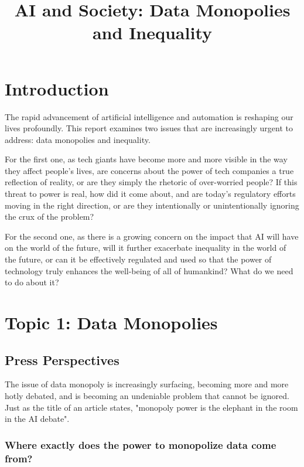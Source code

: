\documentclass[11pt]{article}
\title{AI and Society: Data Monopolies and Inequality}
\begin{document}
\maketitle

\section{Introduction}

The rapid advancement of artificial intelligence and automation is reshaping our lives profoundly. This report examines two issues that are increasingly urgent to address: data monopolies and inequality. 

For the first one, as tech giants have become more and more visible in the way they affect people's lives, are concerns about the power of tech companies a true reflection of reality, or are they simply the rhetoric of over-worried people? If this threat to power is real, how did it come about, and are today's regulatory efforts moving in the right direction, or are they intentionally or unintentionally ignoring the crux of the problem? 

For the second one, as there is a growing concern on the impact that AI will have on the world of the future, will it further exacerbate inequality in the world of the future, or can it be effectively regulated and used so that the power of technology truly enhances the well-being of all of humankind? What do we need to do about it?

\section{Topic 1: Data Monopolies}

\subsection{Press Perspectives}

The issue of data monopoly is increasingly surfacing, becoming more and more hotly debated, and is becoming an undeniable problem that cannot be ignored. 
Just as the title of an article states, "monopoly power is the elephant in the room in the AI debate"\cite{vonThun2023}. 

\subsubsection{Where exactly does the power to monopolize data come from? }
\end{document}
